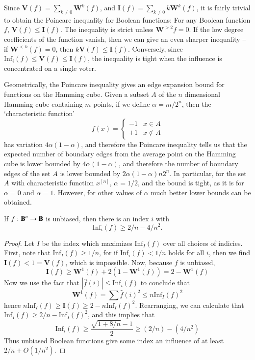 Since $\mathbf{V}(f) = \sum_{k \neq 0} \mathbf{W}^k(f)$, and $\mathbf{I}(f) = \sum_{k \neq 0} k\mathbf{W}^k(f)$, it is fairly trivial to obtain the Poincare inequality for Boolean functions: For any Boolean function $f$, $\mathbf{V}(f) \leq \mathbf{I}(f)$. The inequality is strict unless $\mathbf{W}^{> 2} f = 0$. If the low degree coefficients of the function vanish, then we can give an even sharper inequality -- if $\mathbf{W}^{< k}(f) = 0$, then $k \mathbf{V}(f) \leq \mathbf{I}(f)$. Conversely, since $\text{Inf}_i(f) \leq \mathbf{V}(f) \leq \mathbf{I}(f)$, the inequality is tight when the influence is concentrated on a single voter.

\begin{example}
    Geometrically, the Poincare inequality gives an edge expansion bound for functions on the Hamming cube. Given a subset $A$ of the $n$ dimensional Hamming cube containing $m$ points, if we define $\alpha = m/2^n$, then the `characteristic function'
    \[ f(x) = \begin{cases} -1 & x \in A \\ +1 & x \not \in A \end{cases} \]
    has variation $4 \alpha (1 - \alpha)$, and therefore the Poincare inequality tells us that the expected number of boundary edges from the average point on the Hamming cube is lower bounded by $4 \alpha (1 - \alpha)$, and therefore the number of boundary edges of the set $A$ is lower bounded by $2 \alpha (1 - \alpha) n 2^n$. In particular, for the set $A$ with characteristic function $x^{[n]}$, $\alpha = 1/2$, and the bound is tight, as it is for $\alpha = 0$ and $\alpha = 1$. However, for other values of $\alpha$ much better lower bounds can be obtained.
\end{example}

\begin{lemma}
    If $f: \operatorname{\mathbf{B}}^n \to \operatorname{\mathbf{B}}$ is unbiased, then there is an index $i$ with
    \[ \text{Inf}_i(f) \geq 2/n - 4/n^2. \]
\end{lemma}
\begin{proof}
    Let $I$ be the index which maximizes $\text{Inf}_I(f)$ over all choices of indicies. First, note that $\text{Inf}_I(f) \geq 1/n$, for if $\text{Inf}_i(f) < 1/n$ holds for all $i$, then we find $\mathbf{I}(f) < 1 = \mathbf{V}(f)$, which is impossible. Now, because $f$ is unbiased,
    \[ \mathbf{I}(f) \geq \mathbf{W}^1(f) + 2(1 - \mathbf{W}^1(f)) = 2 - \mathbf{W}^1(f) \]
    Now we use the fact that $|\widehat{f}(i)| \leq \text{Inf}_i(f)$ to conclude that
    \[ \mathbf{W}^1(f) = \sum \widehat{f}(i)^2 \leq n \text{Inf}_I(f)^2 \]
    hence $n \text{Inf}_I(f) \geq \mathbf{I}(f) \geq 2 - n \text{Inf}_I(f)^2$. Rearranging, we can calculate that $\text{Inf}_I(f) \geq 2/n - \text{Inf}_I(f)^2$, and this implies that
    \[ \text{Inf}_i(f) \geq \frac{\sqrt{1 + 8/n} - 1}{2} \geq (2/n) - (4/n^2) \]
    Thus unbiased Boolean functions give some index an influence of at least $2/n + O(1/n^2)$.
\end{proof}

